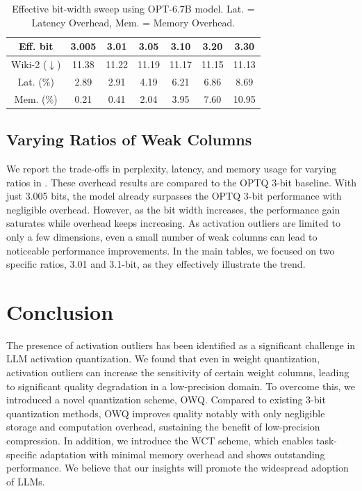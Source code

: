 \documentclass[letterpaper]{article} %
\begin{document}
\begin{table}[t]
    \centering
    \small
    \begin{tabular}{ c | c @{\hskip 0.14in} c @{\hskip 0.14in} c @{\hskip 0.14in} c @{\hskip 0.14in} c @{\hskip 0.14in} c }
    \toprule
    Eff. bit & 3.005 & 3.01 & 3.05 & 3.10 & 3.20 & 3.30 \\
    \midrule
    Wiki-2 ($\downarrow$) & 11.38 & 11.22 & 11.19 & 11.17 & 11.15 & 11.13 \\ 
    Lat. (\%) & 2.89 & 2.91 & 4.19 & 6.21 & 6.86 & 8.69\\
    Mem. (\%) & 0.21 & 0.41 & 2.04 & 3.95 & 7.60 & 10.95 \\
    \bottomrule
   \end{tabular}
   \caption{Effective bit-width sweep using OPT-6.7B model. Lat. = Latency Overhead, Mem. = Memory Overhead.}
   \label{table:ratio_sweep}
\end{table}

\subsection{Varying Ratios of Weak Columns}
We report the trade-offs in perplexity, latency, and memory usage for varying ratios in . These overhead results are compared to the OPTQ 3-bit baseline. 
With just 3.005 bits, the model already surpasses the OPTQ 3-bit performance with negligible overhead. However, as the bit width increases, the performance gain saturates while overhead keeps increasing. As activation outliers are limited to only a few dimensions, even a small number of weak columns can lead to noticeable performance improvements. In the main tables, we focused on two specific ratios, 3.01 and 3.1-bit, as they effectively illustrate the trend. 

\section{Conclusion}
The presence of activation outliers has been identified as a significant challenge in LLM activation quantization. We found that even in weight quantization, activation outliers can increase the sensitivity of certain weight columns, leading to significant quality degradation in a low-precision domain. To overcome this, we introduced a novel quantization scheme, OWQ. Compared to existing 3-bit quantization methods, OWQ improves quality notably with only negligible storage and computation overhead, sustaining the benefit of low-precision compression. In addition, we introduce the WCT scheme, which enables task-specific adaptation with minimal memory overhead and shows outstanding performance. We believe that our insights will promote the widespread adoption of LLMs.
\end{document}
